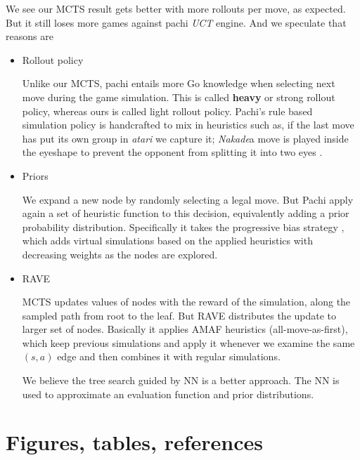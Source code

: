 \documentclass{article}
\begin{document}
We see our MCTS result gets better with more rollouts per move, as expected. But it still loses more games against pachi \textit{UCT} engine. And we speculate that reasons are
\begin{itemize}
  \item
    Rollout policy 

    Unlike our MCTS, pachi entails more Go knowledge when selecting next move during the game simulation. This is called \textbf{heavy} or strong rollout policy, whereas ours is called light rollout policy. Pachi's rule based simulation policy is handcrafted to mix in heuristics such as,  if the last move has put its own group in \textit{atari} we capture it; \textit{Nakade}a move is played inside the eyeshape to prevent the opponent from splitting it into two eyes \cite{baudivs2011pachi}.

  \item
    Priors
  
    We expand a new node by randomly selecting a legal move. But Pachi apply again a set of heuristic function to this decision, equivalently adding a prior probability distribution.  Specifically it takes the progressive bias strategy \cite{gelly2007combining}, which adds virtual simulations based on the applied heuristics with decreasing weights as the nodes are explored.

  \item
    RAVE 

    MCTS updates values of nodes with the reward of the simulation, along the sampled path from root to the leaf. But RAVE \cite{gelly2007combining} distributes the update to larger set of nodes. Basically it applies AMAF heuristics \cite{bouzy2004monte} (all-move-as-first), which keep previous simulations and apply it whenever we examine the same $(s, a)$ edge and then combines it with regular simulations.


    We believe the tree search guided by NN is a better approach. The NN is used to approximate an evaluation function and prior distributions.


\end{itemize}


\section{Figures, tables, references}
\end{document}
